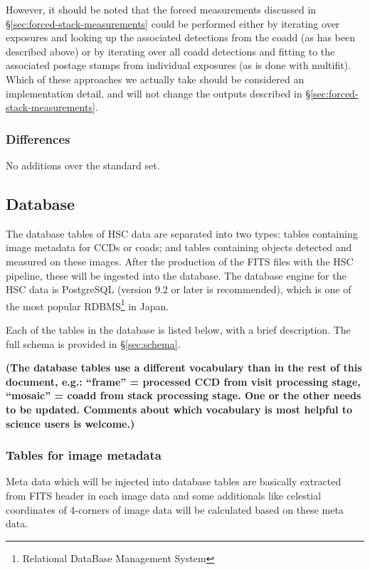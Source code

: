 \documentclass[12pt]{article}
\newcommand\tbd[1]{\textbf{\color{red}(#1)}}
\begin{document}
However, it should be noted that the forced measurements discussed in
\S\ref{sec:forced-stack-measurements} could be performed either by
iterating over exposures and looking up the associated detections from
the coadd (as has been described above) or by iterating over all coadd
detections and fitting to the associated postage stamps from
individual exposures (as is done with multifit).  Which of these
approaches we actually take should be considered an implementation
detail, and will not change the outputs described in
\S\ref{sec:forced-stack-measurements}.

\subsubsection{Differences}

No additions over the standard set.

\subsection{Database}
\label{sec:database}

The database tables of HSC data are separated into two types: tables containing image metadata
for CCDs or coads; and tables containing objects detected and measured
on these images. After the production of the FITS files with the HSC pipeline, these will be
ingested into the database.  The database engine
for the HSC data is PostgreSQL (version 9.2 or later is recommended), which is one of the most
popular RDBMS\footnote{Relational DataBase Management System} in Japan.

Each of the tables in the database is listed below, with a brief description.  The full schema is
provided in \S\ref{sec:schema}.

\tbd{The database tables use a different vocabulary than in the rest of this document, e.g.:
``frame'' = processed CCD from visit processing stage, ``mosaic'' = coadd from stack processing stage.
One or the other needs to be updated.  Comments about which vocabulary is most helpful to science users
is welcome.}

\subsubsection{Tables for image metadata}

Meta data which will be injected into database tables are basically extracted from FITS header
in each image data and some additionals like celestial coordinates of 4-corners of image data
will be calculated based on these meta data.
\end{document}
